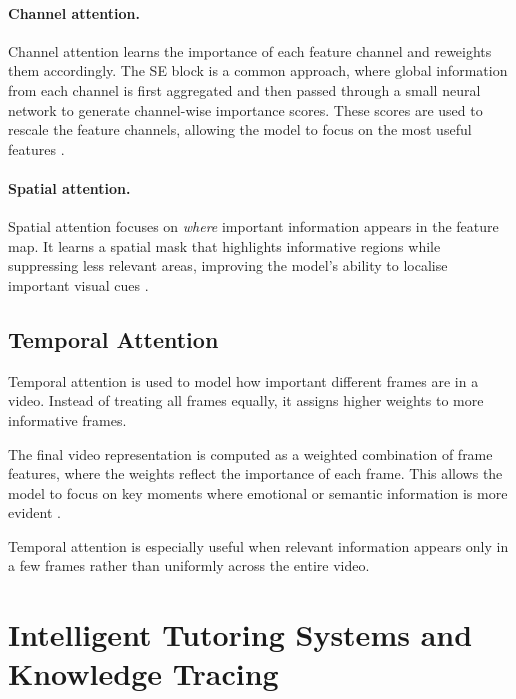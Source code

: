 \paragraph{Channel attention.}
Channel attention learns the importance of each feature channel and reweights them accordingly. The \ac{SE} block is a common approach, where global information from each channel is first aggregated and then passed through a small neural network to generate channel-wise importance scores. These scores are used to rescale the feature channels, allowing the model to focus on the most useful features \cite{hu_squeeze_2018}.

\paragraph{Spatial attention.}
Spatial attention focuses on \textit{where} important information appears in the feature map. It learns a spatial mask that highlights informative regions while suppressing less relevant areas, improving the model’s ability to localise important visual cues \cite{aly_revolutionizing_2025}.

\subsection{Temporal Attention}\label{sec:bg:tempattn}

Temporal attention is used to model how important different frames are in a video. Instead of treating all frames equally, it assigns higher weights to more informative frames.

The final video representation is computed as a weighted combination of frame features, where the weights reflect the importance of each frame. This allows the model to focus on key moments where emotional or semantic information is more evident \cite{mehta_three-dimensional_2022,su_leveraging_2024}.

Temporal attention is especially useful when relevant information appears only in a few frames rather than uniformly across the entire video.


\section{Intelligent Tutoring Systems and Knowledge Tracing}
\label{sec:bg:its}

